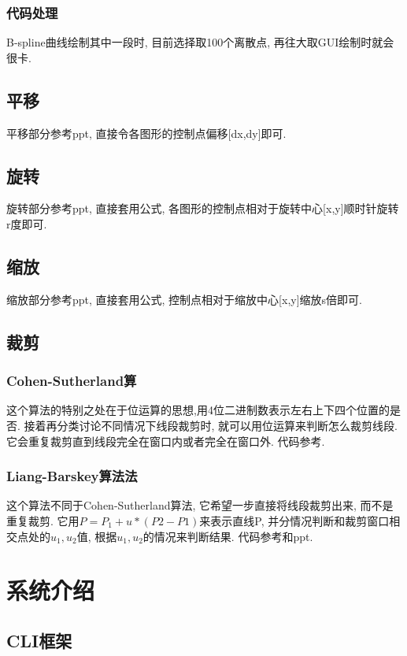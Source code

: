 \documentclass[a4paper,UTF8]{article}
\theoremstyle{definition}
\begin{document}
\subsubsection{代码处理}
B-spline曲线绘制其中一段时, 目前选择取100个离散点, 再往大取GUI绘制时就会很卡.

\subsection{平移}
\indent 平移部分参考ppt, 直接令各图形的控制点偏移[dx,dy]即可.

\subsection{旋转}
\indent 旋转部分参考ppt, 直接套用公式, 各图形的控制点相对于旋转中心[x,y]顺时针旋转r度即可.

\subsection{缩放}
\indent 缩放部分参考ppt, 直接套用公式, 控制点相对于缩放中心[x,y]缩放s倍即可.

\subsection{裁剪}
\subsubsection{Cohen-Sutherland算} 
这个算法的特别之处在于位运算的思想,用4位二进制数表示左右上下四个位置的是否. 接着再分类讨论不同情况下线段裁剪时, 就可以用位运算来判断怎么裁剪线段. 它会重复裁剪直到线段完全在窗口内或者完全在窗口外.
代码参考\cite{cohen_web}.\\
\subsubsection{Liang-Barskey算法法} 
这个算法不同于Cohen-Sutherland算法, 它希望一步直接将线段裁剪出来, 而不是重复裁剪.
它用$P=P_1+u*(P2-P1)$来表示直线P, 并分情况判断和裁剪窗口相交点处的$u_1,u_2$值, 根据$u_1,u_2$的情况来判断结果.
代码参考\cite{liang_web}和ppt.

\section{系统介绍}
\subsection{CLI框架}
\end{document}
